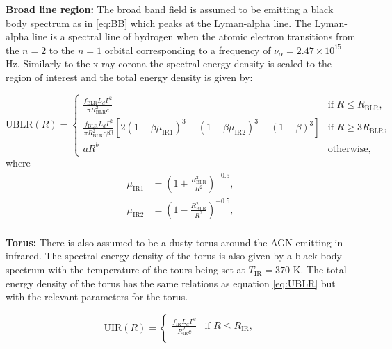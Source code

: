\textbf{Broad line region:} The broad band field is assumed to be emitting a black body spectrum as in \ref*{eq:BB} which peaks at the Lyman-alpha line. The Lyman-alpha line is a spectral line of hydrogen  when the atomic electron transitions from the $n=2$ to the $n=1$ orbital corresponding to a frequency of $\nu_{\alpha} = 2.47 \times 10^{15}$ Hz. 
Similarly to the x-ray corona the spectral energy density is scaled to the region of interest and the total energy density is given by: 


\begin{equation}
    \label{eq:UBLR}
    \text{UBLR}(R) = 
    \begin{cases}
    \frac{f_{\text{BLR}} L_{d} \Gamma^2}{\pi R_{\text{BLR}}^2 c} & \text{if } R \leq R_{\text{BLR}}, \\
    \frac{f_{\text{BLR}} L_{d} \Gamma^2}{\pi R_{\text{BLR}}^2 c \beta 3} \left[2 (1 - \beta \mu_{\text{IR1}})^3 - (1 - \beta \mu_{\text{IR2}})^3 - (1 - \beta)^3\right] & \text{if } R \geq 3R_{\text{BLR}}, \\
    a R^b & \text{otherwise},
    \end{cases}  
\end{equation}
where 
\begin{align*}
    \mu_{\text{IR1}} &= \left(1 + \frac{R_{\text{BLR}}^2}{R^2}\right)^{-0.5}, \\
    \mu_{\text{IR2}} &= \left(1 - \frac{R_{\text{BLR}}^2}{R^2}\right)^{-0.5}, \\
\end{align*}


\textbf{Torus:} There is also assumed to be a dusty torus around the AGN emitting in infrared. The spectral energy density of the torus is also given by 
a black body spectrum with the temperature of the tours being set at $T_{\text{IR}} = 370$ K. The total energy density of the torus has the same relations 
as equation \ref{eq:UBLR} but with the relevant parameters for the torus.

\begin{equation}
    \text{UIR}(R) = 
    \begin{cases}
    \frac{f_{\text{IR}}L_d  \Gamma^2}{R_{\text{IR}}^2 c} & \text{if } R \leq R_{\text{IR}}, \\
    \end{cases}
\end{equation}

